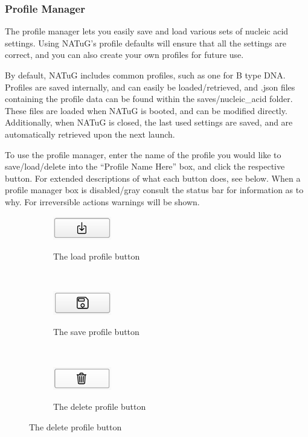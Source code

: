 \documentclass[titlepage]{article}
\begin{document}
	\subsubsection{Profile Manager}
	
	The profile manager lets you easily save and load various sets of nucleic acid settings. Using NATuG’s profile defaults will ensure that all the settings are correct, and you can also create your own profiles for future use.
	
	By default, NATuG includes common profiles, such as one for B type DNA. Profiles are saved internally, and can easily be loaded/retrieved, and .json files containing the profile data can be found within the saves/nucleic\_acid folder. These files are loaded when NATuG is booted, and can be modified directly. Additionally, when NATuG is closed, the last used settings are saved, and are automatically retrieved upon the next launch.
	
	To use the profile manager, enter the name of the profile you would like to save/load/delete into the “Profile Name Here” box, and click the respective button. For extended descriptions of what each button does, see below. When a profile manager box is disabled/gray consult the status bar for information as to why. For irreversible actions warnings will be shown.
	
	\begin{figure}
		\caption{Various Profile Actions}
		
		\centering
		\begin{subfigure}{.3\textwidth}
			\centering
			\caption{The load profile button}
			\includegraphics[width=1in]{load-profile-button.png}
			\label{fig:load-profile-button}
		\end{subfigure}%
		~
		\begin{subfigure}{.3\textwidth}
			\centering
			\caption{The save profile button}
			\includegraphics[width=1in]{save-profile-button.png}
			\label{fig:save-profile-button}
		\end{subfigure}%
		~
		\begin{subfigure}{.3\textwidth}
			\centering
			\caption{The delete profile button}
			\includegraphics[width=1in]{delete-profile-button.png}
			\label{fig:delete-profile-button}
		\end{subfigure}
	\end{figure}
	
\end{document}
